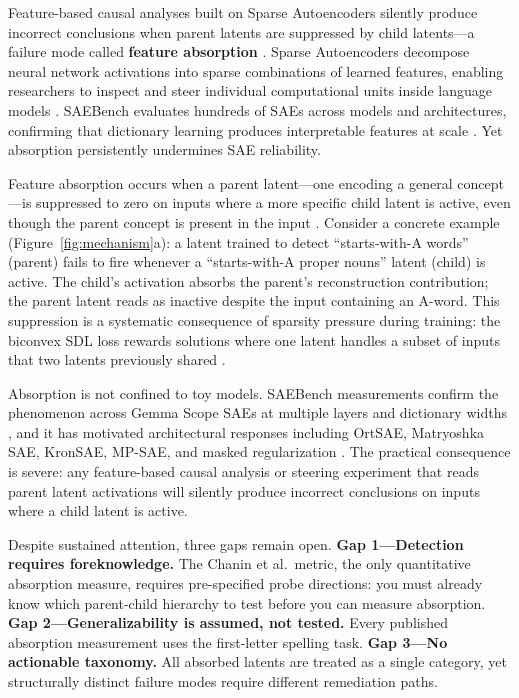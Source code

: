 \documentclass{article}
\begin{document}
Feature-based causal analyses built on Sparse Autoencoders silently produce incorrect conclusions when parent latents are suppressed by child latents---a failure mode called \textbf{feature absorption} \cite{chanin2024absorption}. Sparse Autoencoders decompose neural network activations into sparse combinations of learned features, enabling researchers to inspect and steer individual computational units inside language models \cite{bricken2023monosemanticity,cunningham2023sparse}. SAEBench evaluates hundreds of SAEs across models and architectures, confirming that dictionary learning produces interpretable features at scale \cite{karvonen2025saebench}. Yet absorption persistently undermines SAE reliability.

Feature absorption occurs when a parent latent---one encoding a general concept---is suppressed to zero on inputs where a more specific child latent is active, even though the parent concept is present in the input \cite{chanin2024absorption}. Consider a concrete example (Figure~\ref{fig:mechanism}a): a latent trained to detect ``starts-with-A words'' (parent) fails to fire whenever a ``starts-with-A proper nouns'' latent (child) is active. The child's activation absorbs the parent's reconstruction contribution; the parent latent reads as inactive despite the input containing an A-word. This suppression is a systematic consequence of sparsity pressure during training: the biconvex SDL loss rewards solutions where one latent handles a subset of inputs that two latents previously shared \cite{tang2025unified}.

Absorption is not confined to toy models. SAEBench measurements confirm the phenomenon across Gemma Scope SAEs at multiple layers and dictionary widths \cite{karvonen2025saebench}, and it has motivated architectural responses including OrtSAE, Matryoshka SAE, KronSAE, MP-SAE, and masked regularization \cite{narayanaswamy2026masked,costa2025mpsae}. The practical consequence is severe: any feature-based causal analysis or steering experiment that reads parent latent activations will silently produce incorrect conclusions on inputs where a child latent is active.

Despite sustained attention, three gaps remain open. \textbf{Gap 1---Detection requires foreknowledge.} The Chanin et al.\ metric, the only quantitative absorption measure, requires pre-specified probe directions: you must already know which parent-child hierarchy to test before you can measure absorption. \textbf{Gap 2---Generalizability is assumed, not tested.} Every published absorption measurement uses the first-letter spelling task. \textbf{Gap 3---No actionable taxonomy.} All absorbed latents are treated as a single category, yet structurally distinct failure modes require different remediation paths.
\end{document}
